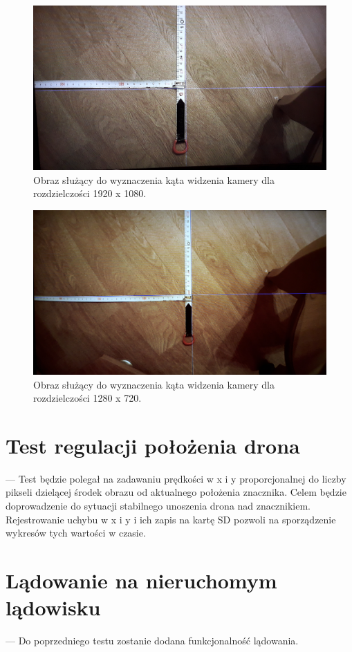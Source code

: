 \begin{figure}[h]
	\centering
	\includegraphics[width=\textwidth]{1080p.jpg}
	\caption{Obraz służący do wyznaczenia kąta widzenia kamery dla rozdzielczości 1920 x 1080.}
	\label{fig:1080p}
\end{figure}
\begin{figure}[h]
	\centering
	\includegraphics[width=\textwidth]{720p.jpg}
	\caption{Obraz służący do wyznaczenia kąta widzenia kamery dla rozdzielczości 1280 x 720.}
	\label{fig:720p}
\end{figure}

\fi

\section{Test regulacji położenia drona}
\label{sec:test_regulacji_polozenia_drona}
--- Test będzie polegał na zadawaniu prędkości w x i y proporcjonalnej do liczby pikseli dzielącej środek obrazu od aktualnego położenia znacznika. 
Celem będzie doprowadzenie do sytuacji stabilnego unoszenia drona nad znacznikiem. 
Rejestrowanie uchybu w x i y i ich zapis na kartę SD pozwoli na sporządzenie wykresów tych wartości w czasie.

\section{Lądowanie na nieruchomym lądowisku}
\label{sec:ladowanie_na_nieruchomym_ladowisku}
--- Do poprzedniego testu zostanie dodana funkcjonalność lądowania.
